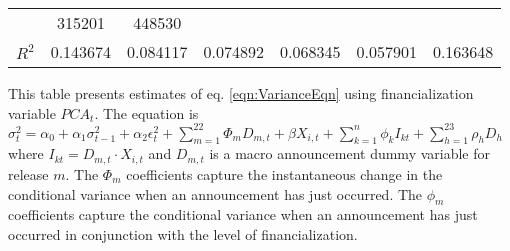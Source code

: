 \begin{sidewaystable}
{\begin{tabular}{@{}lllllllllllll@{}}
            & \multicolumn{2}{c}{ 315201 }                                                   & \multicolumn{2}{c}{ 448530 }                                                 \\ \textbf{$R^2$}             &\multicolumn{2}{c}{ 0.143674 }                                                 & \multicolumn{2}{c}{ 0.084117 }                                                 & \multicolumn{2}{c}{ 0.074892 }                                                 & \multicolumn{2}{c}{ 0.068345 }                                                 & \multicolumn{2}{c}{ 0.057901 }                                                   & \multicolumn{2}{c}{ 0.163648 }                                                 \\ \bottomrule 
\end{tabular}
}
\begin{tablenotes}\item 
        \singlespacing
        \footnotesize
        This table presents estimates of eq. \ref{eqn:VarianceEqn} using financialization variable $PCA_t$. The equation is $\sigma_{t}^2=\alpha_0+\alpha_1 \sigma_{t-1}^2+\alpha_2 \epsilon_t^2 +\sum_{m=1}^{22} \Phi_m D_{m,t}+\beta X_{i,t}+\sum_{k=1}^n \phi_k I_{kt} + \sum_{h=1}^{23} \rho_h D_h$ where $I_{kt}=D_{m,t} \cdot X_{i,t}$ and $D_{m,t}$ is a macro announcement dummy variable for release $m$. The $\Phi_m$ coefficients capture the instantaneous change in the conditional variance when an announcement has just occurred. The $\phi_m$ coefficients capture the conditional variance when an announcement has just occurred in conjunction with the level of financialization.
\end{tablenotes}
\end{sidewaystable}

